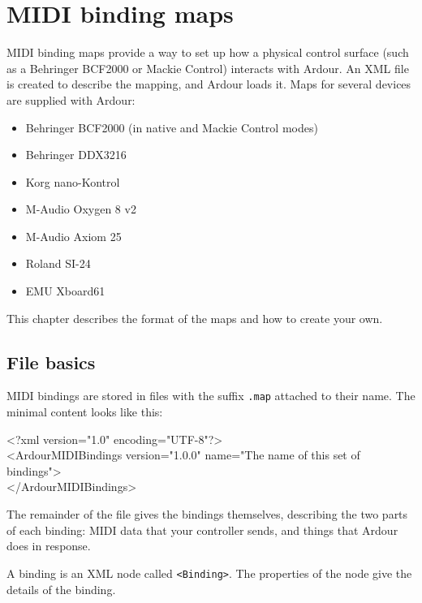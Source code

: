 \documentclass[10pt,a4paper]{book}
\begin{document}
\section{MIDI binding maps}

MIDI binding maps provide a way to set up how a physical control
surface (such as a Behringer BCF2000 or Mackie Control) interacts with
Ardour.  An XML file is created to describe the mapping, and Ardour
loads it.  Maps for several devices are supplied with Ardour:

\begin{itemize}
\item Behringer BCF2000 (in native and Mackie Control modes)
\item Behringer DDX3216
\item Korg nano-Kontrol
\item M-Audio Oxygen 8 v2
\item M-Audio Axiom 25
\item Roland SI-24
\item EMU Xboard61
\end{itemize}

This chapter describes the format of the maps and how to create your own.


\subsection{File basics}

MIDI bindings are stored in files with the suffix \texttt{.map}
attached to their name. The minimal content looks like this:

\begin{listing}
<?xml version="1.0" encoding="UTF-8"?>\\
<ArdourMIDIBindings version="1.0.0" name="The name of this set of bindings">\\
</ArdourMIDIBindings>\\
\end{listing}

The remainder of the file gives the bindings themselves, describing
the two parts of each binding: MIDI data that your controller sends,
and things that Ardour does in response.

A binding is an XML node called \texttt{<Binding>}.  The properties of the
node give the details of the binding.  


\end{document}
